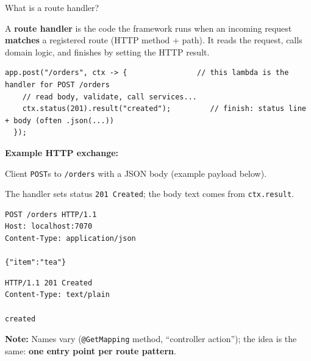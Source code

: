 \question[4]
What is a route handler?
\makeemptybox{1.00in}
\begin{solution}
  A \textbf{route handler} is the code the framework runs when an incoming request \textbf{matches} a registered route (HTTP method + path). It reads the request, calls domain logic, and finishes by setting the HTTP result.

  \begin{lstlisting}[style=javaexam]
  app.post("/orders", ctx -> {                // this lambda is the handler for POST /orders
    // read body, validate, call services...
    ctx.status(201).result("created");         // finish: status line + body (often .json(...))
  });
  \end{lstlisting}

  \noindent\textbf{Example HTTP exchange:}\par
  \noindent Client \texttt{POST}s to \texttt{/orders} with a JSON body (example payload below).\par
  \noindent The handler sets status \texttt{201~Created}; the body text comes from \texttt{ctx.result}.\par
  \begin{httpexchange}
\begin{lstlisting}[style=http]
POST /orders HTTP/1.1
Host: localhost:7070
Content-Type: application/json

{"item":"tea"}
\end{lstlisting}
\httpmidarrows
\begin{lstlisting}[style=http]
HTTP/1.1 201 Created
Content-Type: text/plain

created
\end{lstlisting}
  \end{httpexchange}

  \noindent\textbf{Note:} Names vary (\texttt{@GetMapping} method, ``controller action''); the idea is the same: \textbf{one entry point per route pattern}.
\end{solution}


\newpage


